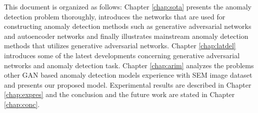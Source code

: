 This document is organized as follows: Chapter \ref{chap:sota} presents the anomaly detection 
problem thoroughly, introduces the networks that are used for constructing anomaly 
detection methods such as generative adversarial networks and autoencoder networks and finally 
illustrates mainstream anomaly detection methods that utilizes generative adversarial 
networks. Chapter \ref{chap:latdel} introduces some of the latest developments concerning 
generative adversarial networks and anomaly detection task. Chapter \ref{chap:arim} 
analyzes the problems other GAN based anomaly detection models experience with SEM image dataset 
and presents our proposed model. Experimental results are described in Chapter \ref{chap:expres} 
and the conclusion and the future work are  stated in Chapter \ref{chap:conc}.

\endgroup